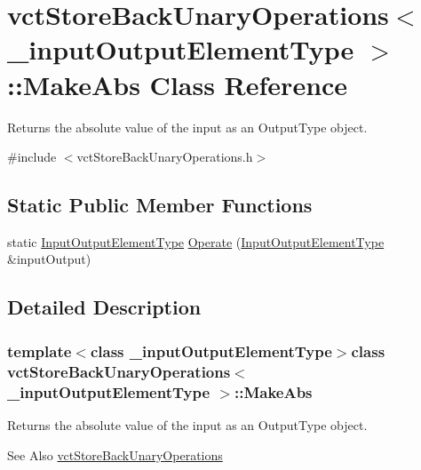 \hypertarget{classvct_store_back_unary_operations_1_1_make_abs}{\section{vct\-Store\-Back\-Unary\-Operations$<$ \-\_\-input\-Output\-Element\-Type $>$\-:\-:Make\-Abs Class Reference}
\label{classvct_store_back_unary_operations_1_1_make_abs}
}


Returns the absolute value of the input as an Output\-Type object.  




{\ttfamily \#include $<$vct\-Store\-Back\-Unary\-Operations.\-h$>$}

\subsection*{Static Public Member Functions}
\begin{DoxyCompactItemize}
\item 
static \hyperlink{classvct_store_back_unary_operations_a8af17faaa73a8d090094d468eee32062}{Input\-Output\-Element\-Type} \hyperlink{classvct_store_back_unary_operations_1_1_make_abs_afe23ed0cc7cc3dac5e2e8bd4623f39b3}{Operate} (\hyperlink{classvct_store_back_unary_operations_a8af17faaa73a8d090094d468eee32062}{Input\-Output\-Element\-Type} \&input\-Output)
\end{DoxyCompactItemize}


\subsection{Detailed Description}
\subsubsection*{template$<$class \-\_\-input\-Output\-Element\-Type$>$class vct\-Store\-Back\-Unary\-Operations$<$ \-\_\-input\-Output\-Element\-Type $>$\-::\-Make\-Abs}

Returns the absolute value of the input as an Output\-Type object. 

\begin{DoxySeeAlso}{See Also}
\hyperlink{classvct_store_back_unary_operations}{vct\-Store\-Back\-Unary\-Operations} 
\end{DoxySeeAlso}


